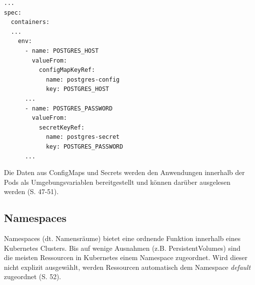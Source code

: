 \documentclass[11pt,a4paper]{article}
\begin{document}

\begin{lstlisting}[caption={Referenzen zur ConfigMaps und Secrets können in einem Deployment unter dem Schlüssel \emph{env} definiert werden \cite{Schmeling_Dargatz_2022} (S. 50).}, label={lst:deploy-with-conf}]
...
spec:
  containers:
  ...
    env:
      - name: POSTGRES_HOST
        valueFrom:
          configMapKeyRef:
            name: postgres-config
            key: POSTGRES_HOST
      ...
      - name: POSTGRES_PASSWORD
        valueFrom:
          secretKeyRef:
            name: postgres-secret
            key: POSTGRES_PASSWORD
      ...
\end{lstlisting}

Die Daten aus ConfigMaps und Secrets werden den Anwendungen innerhalb der Pods als Umgebungsvariablen
bereitgestellt und können darüber ausgelesen werden \cite{Schmeling_Dargatz_2022} (S. 47-51).

\subsection{Namespaces}
Namespaces (dt. Namensräume) bietet eine ordnende Funktion innerhalb eines Kubernetes Clusters.
Bis auf wenige Ausnahmen (z.B. PersistentVolumes) sind die meisten Ressourcen in Kubernetes einem
Namespace zugeordnet. Wird dieser nicht explizit ausgewählt, werden Ressourcen automatisch dem
Namespace \emph{default} zugeordnet \cite{Schmeling_Dargatz_2022} (S. 52).
\end{document}
